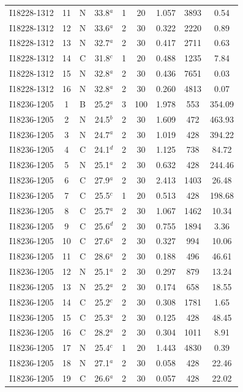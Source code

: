\begin{table}
\begin{tabular}{ccccccccc}
I18228-1312 & 11 & N & 33.8$^{a}$ & 1 & 20 & 1.057 & 3893 & 0.54 \\
I18228-1312 & 12 & N & 33.6$^{a}$ & 2 & 30 & 0.322 & 2220 & 0.89 \\
I18228-1312 & 13 & N & 32.7$^{a}$ & 2 & 30 & 0.417 & 2711 & 0.63 \\
I18228-1312 & 14 & C & 31.8$^{c}$ & 1 & 20 & 0.488 & 1235 & 7.84 \\
I18228-1312 & 15 & N & 32.8$^{a}$ & 2 & 30 & 0.436 & 7651 & 0.03 \\
I18228-1312 & 16 & N & 32.8$^{a}$ & 2 & 30 & 0.260 & 4813 & 0.07 \\
I18236-1205 & 1 & B & 25.2$^{a}$ & 3 & 100 & 1.978 & 553 & 354.09 \\
I18236-1205 & 2 & N & 24.5$^{b}$ & 2 & 30 & 1.609 & 472 & 463.93 \\
I18236-1205 & 3 & N & 24.7$^{a}$ & 2 & 30 & 1.019 & 428 & 394.22 \\
I18236-1205 & 4 & C & 24.1$^{d}$ & 2 & 30 & 1.125 & 738 & 84.72 \\
I18236-1205 & 5 & N & 25.1$^{a}$ & 2 & 30 & 0.632 & 428 & 244.46 \\
I18236-1205 & 6 & C & 27.9$^{a}$ & 2 & 30 & 2.413 & 1403 & 26.48 \\
I18236-1205 & 7 & C & 25.5$^{c}$ & 1 & 20 & 0.513 & 428 & 198.68 \\
I18236-1205 & 8 & C & 25.7$^{a}$ & 2 & 30 & 1.067 & 1462 & 10.34 \\
I18236-1205 & 9 & C & 25.6$^{d}$ & 2 & 30 & 0.755 & 1894 & 3.36 \\
I18236-1205 & 10 & C & 27.6$^{a}$ & 2 & 30 & 0.327 & 994 & 10.06 \\
I18236-1205 & 11 & C & 28.6$^{a}$ & 2 & 30 & 0.188 & 496 & 46.61 \\
I18236-1205 & 12 & N & 25.1$^{a}$ & 2 & 30 & 0.297 & 879 & 13.24 \\
I18236-1205 & 13 & N & 25.2$^{a}$ & 2 & 30 & 0.174 & 658 & 18.55 \\
I18236-1205 & 14 & C & 25.2$^{c}$ & 2 & 30 & 0.308 & 1781 & 1.65 \\
I18236-1205 & 15 & C & 25.3$^{a}$ & 2 & 30 & 0.125 & 428 & 48.45 \\
I18236-1205 & 16 & C & 28.2$^{a}$ & 2 & 30 & 0.304 & 1011 & 8.91 \\
I18236-1205 & 17 & N & 25.4$^{c}$ & 1 & 20 & 1.443 & 4830 & 0.39 \\
I18236-1205 & 18 & N & 27.1$^{a}$ & 2 & 30 & 0.058 & 428 & 22.46 \\
I18236-1205 & 19 & C & 26.6$^{a}$ & 2 & 30 & 0.057 & 428 & 22.02 \\

\end{tabular}
\end{table}
